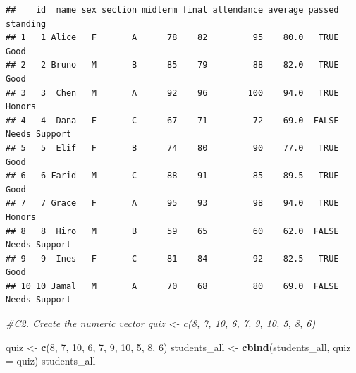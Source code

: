 \documentclass[
]{article}
\newenvironment{Shaded}{\begin{snugshade}}{\end{snugshade}}
\newcommand{\AttributeTok}[1]{\textcolor[rgb]{0.13,0.29,0.53}{#1}}
\newcommand{\CommentTok}[1]{\textcolor[rgb]{0.56,0.35,0.01}{\textit{#1}}}
\newcommand{\DecValTok}[1]{\textcolor[rgb]{0.00,0.00,0.81}{#1}}
\newcommand{\FunctionTok}[1]{\textcolor[rgb]{0.13,0.29,0.53}{\textbf{#1}}}
\newcommand{\NormalTok}[1]{#1}
\newcommand{\OtherTok}[1]{\textcolor[rgb]{0.56,0.35,0.01}{#1}}
\newcommand{\SpecialCharTok}[1]{\textcolor[rgb]{0.81,0.36,0.00}{\textbf{#1}}}
\newcommand{\StringTok}[1]{\textcolor[rgb]{0.31,0.60,0.02}{#1}}
\begin{document}
\begin{Shaded}
\end{Shaded}

\begin{verbatim}
##    id  name sex section midterm final attendance average passed      standing
## 1   1 Alice   F       A      78    82         95    80.0   TRUE          Good
## 2   2 Bruno   M       B      85    79         88    82.0   TRUE          Good
## 3   3  Chen   M       A      92    96        100    94.0   TRUE        Honors
## 4   4  Dana   F       C      67    71         72    69.0  FALSE Needs Support
## 5   5  Elif   F       B      74    80         90    77.0   TRUE          Good
## 6   6 Farid   M       C      88    91         85    89.5   TRUE          Good
## 7   7 Grace   F       A      95    93         98    94.0   TRUE        Honors
## 8   8  Hiro   M       B      59    65         60    62.0  FALSE Needs Support
## 9   9  Ines   F       C      81    84         92    82.5   TRUE          Good
## 10 10 Jamal   M       A      70    68         80    69.0  FALSE Needs Support
\end{verbatim}

\begin{Shaded}
\begin{Highlighting}[]
\CommentTok{\#C2. Create the numeric vector quiz \textless{}{-} c(8, 7, 10, 6, 7, 9, 10, 5, 8, 6)}

\NormalTok{quiz }\OtherTok{\textless{}{-}} \FunctionTok{c}\NormalTok{(}\DecValTok{8}\NormalTok{, }\DecValTok{7}\NormalTok{, }\DecValTok{10}\NormalTok{, }\DecValTok{6}\NormalTok{, }\DecValTok{7}\NormalTok{, }\DecValTok{9}\NormalTok{, }\DecValTok{10}\NormalTok{, }\DecValTok{5}\NormalTok{, }\DecValTok{8}\NormalTok{, }\DecValTok{6}\NormalTok{)}
\NormalTok{students\_all }\OtherTok{\textless{}{-}} \FunctionTok{cbind}\NormalTok{(students\_all, }\AttributeTok{quiz =}\NormalTok{ quiz)}
\NormalTok{students\_all}
\end{Highlighting}
\end{Shaded}
\end{document}
